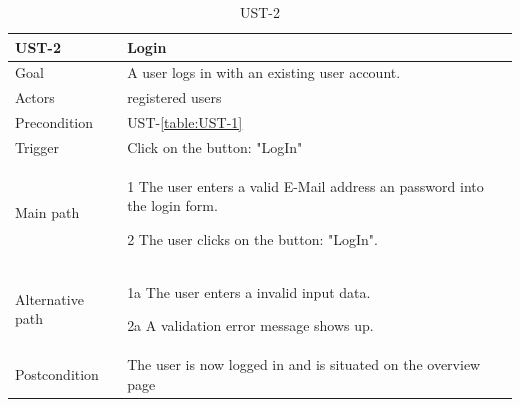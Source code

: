 \documentclass[titlepage, 12pt]{article}
\newenvironment{packed_itemize}{
  \vspace{-\topsep}
  \begin{itemize}
    \setlength{\itemsep}{1pt}
    \setlength{\parskip}{0pt}
    \setlength{\parsep}{0pt}
  }{\end{itemize}}
\begin{document}
\begin{table}[H]
  \begin{center}

    \begin{tabular}{p{4cm}|p{10cm}}
      \textbf{UST-2}   & \textbf{Login}                                                 \\
      \hline
      Goal             & A user logs in with an existing user account.                  \\
      \hline
      Actors           & registered users                                               \\
      \hline
      Precondition     & UST-\ref{table:UST-1}                                          \\
      \hline
      Trigger          & Click on the button: "LogIn"                                   \\
      \hline
      Main path        &
      \begin{packed_itemize}
        \item [1] The user enters a valid E-Mail address an password into the login form.
        \item [2] The user clicks on the button: "LogIn".
      \end{packed_itemize}                                                         \\
      \hline
      Alternative path &
      \begin{packed_itemize}
        \item [1a] The user enters a invalid input data.
        \item [2a] A validation error message shows up.
      \end{packed_itemize}                                                         \\
      \hline
      Postcondition    & The user is now logged in and is situated on the overview page \\
    \end{tabular}

    \caption{UST-2}
    \label{table:UST-2}

  \end{center}
\end{table}
\end{document}

